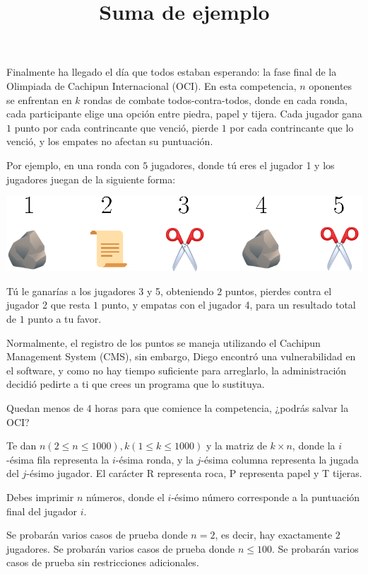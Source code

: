\documentclass{oci}
\title{Suma de ejemplo}
\begin{document}
\begin{problemDescription}
  Finalmente ha llegado el día que todos estaban esperando: la fase final de la Olimpiada de
  Cachipun Internacional (OCI). En esta competencia, $n$ oponentes se enfrentan en $k$ rondas de combate
  todos-contra-todos, donde en cada ronda, cada participante elige una opción entre piedra, 
  papel y tijera. Cada jugador gana $1$ punto por cada contrincante que venció, pierde $1$ por cada 
  contrincante que lo venció, y los empates no afectan su puntuación.

  Por ejemplo, en una ronda con $5$ jugadores, donde tú eres el jugador 1 y los jugadores juegan de 
  la siguiente forma:

  \includegraphics{ronda.eps}

  Tú le ganarías a los jugadores 3 y 5, obteniendo $2$ puntos, pierdes contra el jugador 2 que resta $1$ 
  punto, y empatas con el jugador 4, para un resultado total de $1$ punto a tu favor.

  Normalmente, el registro de los puntos se maneja utilizando el Cachipun Management System (CMS), 
  sin embargo, Diego encontró una vulnerabilidad en el software, y como no hay tiempo suficiente 
  para arreglarlo, la administración decidió pedirte a ti que crees un programa que lo sustituya.

  Quedan menos de 4 horas para que comience la competencia, ¿podrás salvar la OCI?
\end{problemDescription}

\begin{inputDescription}
  Te dan $n (2 \leq n \leq 1000), k (1 \leq k \leq 1000)$ y la matriz de $k \times n$, 
  donde la $i$-ésima fila representa la $i$-ésima ronda, y la $j$-ésima columna representa la jugada del $j$-ésimo jugador.
  El carácter R representa roca, P representa papel y T tijeras.
\end{inputDescription}

\begin{outputDescription}
  Debes imprimir $n$ números, donde el $i$-ésimo número corresponde a la puntuación final del jugador $i$.
\end{outputDescription}

\begin{scoreDescription}
   Se probarán varios casos de prueba donde $n = 2$, es decir, hay exactamente $2$ jugadores.
   Se probarán varios casos de prueba donde $n \leq 100$.
   Se probarán varios casos de prueba sin restricciones adicionales.
\end{scoreDescription}

\begin{sampleDescription}
\end{sampleDescription}
\end{document}
